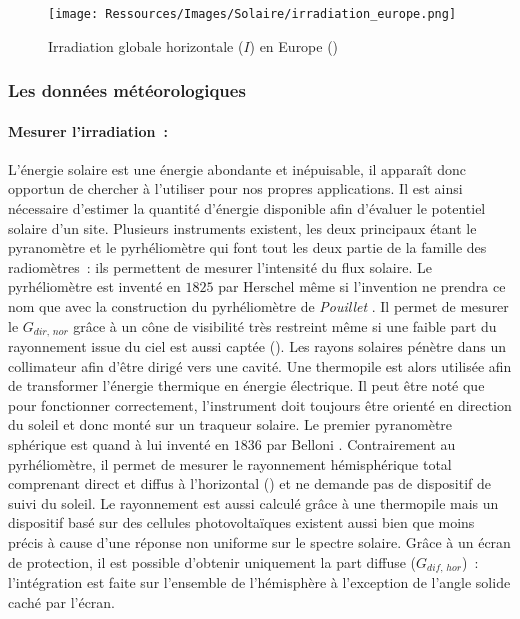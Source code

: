 \begin{figure}
    \centering
    \texttt{[image: Ressources/Images/Solaire/irradiation\_europe.png]}
    \caption[Irradiation globale horizontale en Europe]
            {Irradiation globale horizontale ($I$) en Europe ()}
    \label{fig:gisement_solaire}
\end{figure}


\subsubsection{Les données météorologiques} %
\label{ssub:les_donnees_meteorologiques}
\paragraph{Mesurer l’irradiation~:} %
\label{par:mesurer_l_irradiation_}
L’énergie solaire est une énergie abondante et inépuisable, il apparaît donc opportun
de chercher à l’utiliser pour nos propres applications. Il est ainsi nécessaire
d’estimer la quantité d’énergie disponible afin d’évaluer le potentiel solaire d’un site.
Plusieurs instruments existent, les deux principaux étant le pyranomètre et le
pyrhéliomètre qui font tout les deux partie de la famille des radiomètres~: ils permettent
de mesurer l’intensité du flux solaire. Le pyrhéliomètre est inventé en $1825$ par
Herschel \parencite{Kutz2013} même si l’invention ne prendra ce nom que avec la
construction du pyrhéliomètre de \textit{Pouillet} \parencite{Boer1985}. Il permet de
mesurer le $G_{dir,\,nor}$ grâce à un cône de visibilité très restreint même si une faible
part du rayonnement issue du ciel est aussi captée ().
Les rayons solaires pénètre dans un collimateur afin d’être dirigé vers une cavité. Une
thermopile est alors utilisée afin de transformer l’énergie thermique en énergie
électrique. Il peut être noté que pour fonctionner correctement, l’instrument doit
toujours être orienté en direction du soleil et donc monté sur un traqueur solaire. Le
premier pyranomètre sphérique est quand à lui inventé en $1836$ par Belloni
\parencite{Boer1985}. Contrairement au pyrhéliomètre, il permet de mesurer le rayonnement
hémisphérique total comprenant direct et diffus à l’horizontal () et ne demande pas
de dispositif de suivi du soleil. Le rayonnement est aussi calculé grâce à une thermopile
mais un dispositif basé sur des cellules photovoltaïques existent aussi bien que moins
précis à cause d’une réponse non uniforme sur le spectre solaire. Grâce à un écran de
protection, il est possible d’obtenir uniquement la part diffuse ($G_{dif,\,hor}$)~: l’intégration
est faite sur l’ensemble de l’hémisphère à l’exception de l’angle solide caché par
l’écran.


